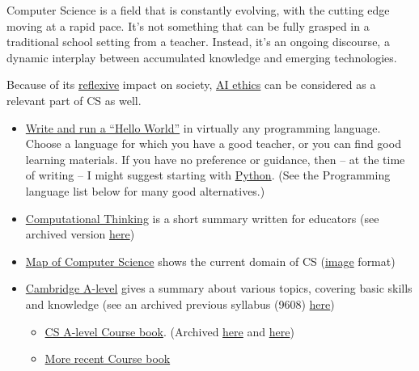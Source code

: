 \documentclass{article}
\begin{document}
Computer Science is a field that is constantly evolving, with the cutting edge moving at a rapid pace. It's not something that can be fully grasped in a traditional school setting from a teacher. Instead, it's an ongoing discourse, a dynamic interplay between accumulated knowledge and emerging technologies.

Because of its \href{https://en.wikipedia.org/wiki/Reflexivity_(social_theory)}{reflexive} impact on society, \href{https://en.wikipedia.org/wiki/Ethics_of_artificial_intelligence}{AI ethics} can be considered as a relevant part of CS as well.


\begin{itemize}

    \item \underline{Write and run a ``Hello World''} in virtually any programming language. Choose a language for which you have a good teacher, or you can find good learning materials. If you have no preference or guidance, then -- at the time of writing -- I might suggest starting with \href{https://www.python.org/}{Python}. (See the Programming language list below for many good alternatives.)
    
    \item \href{https://www.cs.cmu.edu/~15110-s13/Wing06-ct.pdf}{Computational Thinking} is a short summary written for educators (see archived version \href{https://web.archive.org/web/20240429195355/https://www.cs.cmu.edu/~15110-s13/Wing06-ct.pdf}{here})
    
    \item \href{https://www.youtube.com/watch?v=SzJ46YA_RaA}{Map of Computer Science} shows the current domain of CS (\href{https://i.pinimg.com/originals/b0/d1/da/b0d1da585ebcac73f17e10e91b30eaf6.png}{image} format)

    \item \href{https://www.cambridgeinternational.org/programmes-and-qualifications/cambridge-international-as-and-a-level-computer-science-9618/}{Cambridge A-level} gives a summary about various topics, covering basic skills and knowledge (see an archived previous syllabus (9608) \href{https://web.archive.org/web/20220119055409/https://www.cambridgeinternational.org/programmes-and-qualifications/cambridge-international-as-and-a-level-computer-science-9608/}{here})
    \begin{itemize}
        \item \href{https://www.goodreads.com/book/show/13725701-cambridge-international-as-and-a-level-computing-coursebook}{CS A-level Course book}. (Archived \href{https://web.archive.org/web/20240000000000*/https://www.gceguide.xyz/files/e-books/a-level/Computing.pdf}{here} and \href{https://web.archive.org/web/20200701000000*/https://www.gceguide.xyz/gce-e-books/cambridge-international-as-a-level-computer-science-coursebook}{here})
        \item \href{https://www.goodreads.com/book/show/42926237-cambridge-international-as-a-level-computer-science}{More recent Course book}
    \end{itemize}
     

\end{itemize}
\end{document}
